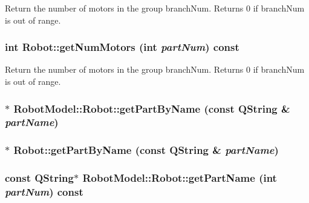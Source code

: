 Return the number of motors in the group branchNum. Returns 0 if branchNum is out of range. \hypertarget{class_robot_model_1_1_robot_ac291608df7ce0cbe818d2da837ca008a}{
\subsubsection[{getNumMotors}]{\setlength{\rightskip}{0pt plus 5cm}int Robot::getNumMotors (int {\em partNum}) const}}
\label{class_robot_model_1_1_robot_ac291608df7ce0cbe818d2da837ca008a}


Return the number of motors in the group branchNum. Returns 0 if branchNum is out of range. \hypertarget{class_robot_model_1_1_robot_a5a24673b9e7b3a95f68cf543b6c2f7a0}{
\subsubsection[{getPartByName}]{$\ast$ RobotModel::Robot::getPartByName (const QString \& {\em partName})}}
\label{class_robot_model_1_1_robot_a5a24673b9e7b3a95f68cf543b6c2f7a0}
\hypertarget{class_robot_model_1_1_robot_af23f77831c87476ad0a43c624dd4b254}{
\subsubsection[{getPartByName}]{ $\ast$ Robot::getPartByName (const QString \& {\em partName})}}
\label{class_robot_model_1_1_robot_af23f77831c87476ad0a43c624dd4b254}
\hypertarget{class_robot_model_1_1_robot_a3fb8fb4e1d19bdf1c4c9278d2e9bcd31}{
\subsubsection[{getPartName}]{\setlength{\rightskip}{0pt plus 5cm}const QString$\ast$ RobotModel::Robot::getPartName (int {\em partNum}) const}}
\label{class_robot_model_1_1_robot_a3fb8fb4e1d19bdf1c4c9278d2e9bcd31}


